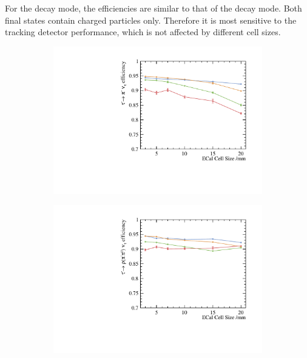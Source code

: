 For the \tauToAiPion decay mode, the efficiencies are similar to that of the \tauToPion decay mode. Both final states contain charged particles only. Therefore it is most sensitive to the tracking detector performance, which is not affected by different \ECAL cell sizes.


\begin{figure}[htbp]
\centering %
\begin{subfigure}[b]{0.45\textwidth}
  \includegraphics[width=\textwidth]{tau/plots3/decayMode2.pdf}
  \caption{}
  \label{fig:tauDecayMode2}
\end{subfigure}
\begin{subfigure}[b]{0.45\textwidth}
  \includegraphics[width=\textwidth]{tau/plots3/decayMode3.pdf}

\end{subfigure}
\end{figure}
